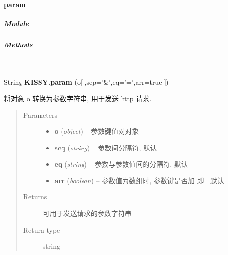 \documentclass[letterpaper,10pt,english]{sphinxmanual}
\begin{document}
\paragraph{param}
\label{api/seed/lang/param::doc}\label{api/seed/lang/param:param}

\subparagraph{Module}
\label{api/seed/lang/param:module}\begin{quote}

{\hyperref[api/seed/lang/index:module-Lang]{}}
\end{quote}


\subparagraph{Methods}
\label{api/seed/lang/param:methods}

\begin{fulllineitems}
\label{api/seed/lang/param:Lang.KISSY.param}~
\begin{DUlineblock}{0em}
\item[] String \textbf{KISSY.param} (o{[} ,sep='\&',eq='=',arr=true {]})
\item[] 将对象 o 转换为参数字符串, 用于发送 http 请求.
\end{DUlineblock}
\begin{quote}\begin{description}
\item[{Parameters}] \leavevmode\begin{itemize}
\item {}
\textbf{o} (\emph{object}) -- 参数键值对对象

\item {}
\textbf{seq} (\emph{string}) -- 参数间分隔符, 默认 \code{\&}

\item {}
\textbf{eq} (\emph{string}) -- 参数与参数值间的分隔符, 默认 \code{=}

\item {}
\textbf{arr} (\emph{boolean}) -- 参数值为数组时, 参数键是否加 \code{{[}{]}} 即  , 默认 

\end{itemize}

\item[{Returns}] \leavevmode
可用于发送请求的参数字符串

\item[{Return type}] \leavevmode
string

\end{description}\end{quote}


\end{fulllineitems}
\end{document}
